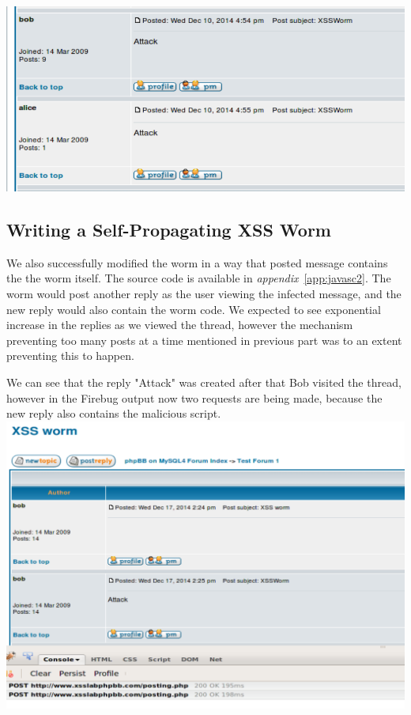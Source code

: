 \documentclass[12pt, a4paper]{article}
\begin{document}
\includegraphics[width=.95\textwidth]{gfx/xss/task5-worm-working}

\subsection{Writing a Self-Propagating XSS Worm}
We also successfully modified the worm in a way that posted message contains the the worm itself. The source code is available in \emph{appendix}~\ref{app:javasc2}.
The worm would post another reply as the user viewing the infected message, and the new reply would also contain the worm code. We expected to see exponential increase in the replies as we viewed the thread, however the mechanism preventing too many posts at a time mentioned in previous part was to an extent preventing this to happen.

We can see that the reply "Attack" was created after that Bob visited the thread, however in the Firebug output now two requests are being made, because the new reply also contains the malicious script.\\
\includegraphics[width=.95\textwidth]{gfx/xss/task6}
\end{document}
